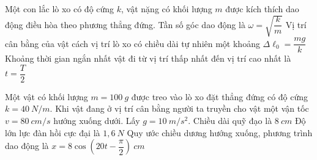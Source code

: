 \PhanII 
\setcounter{ex}{0}
\begin{ex}
Một con lắc lò xo có độ cứng $k$, vật nặng có khối lượng $m$ được kích thích dao động điều hòa theo phương thẳng đứng.
{\True Tần số góc dao động là $\omega=\sqrt{\dfrac{k}{m}}$}
{\True Vị trí cân bằng của vật cách vị trí lò xo có chiều dài tự nhiên một khoảng $\Delta \ell_0=\dfrac{mg}{k}$}
{\True Khoảng thời gian ngắn nhất vật đi từ vị trí thấp nhất đến vị trí cao nhất là $t=\dfrac{T}{2}$}
\end{ex} 
\begin{ex}
Một vật có khối lượng $m=100 \ g$ được treo vào lò xo đặt thẳng đứng có độ cứng $k=40 \ N/m$. Khi vật đang ở vị trí cân bằng người ta truyền cho vật một vận tốc $v=80 \ cm/s$ hướng xuống dưới. Lấy $g=10 \ m/s^2$.
{\True Chiều dài quỹ đạo là $8 \ cm$}
{Độ lớn lực đàn hồi cực đại là $1,6 \ N$}
{Quy ước chiều dương hướng xuống, phương trình dao động là $x=8 \cos \left(20 t-\dfrac{\pi}{2}\right)\ cm$}
\end{ex} 


















